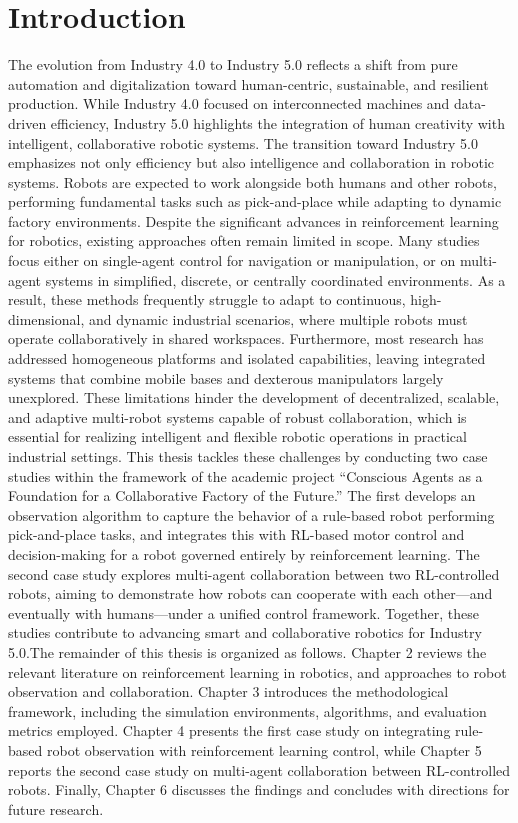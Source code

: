 \documentclass[english, 12pt, a4paper, elec, utf8, a-2b, online]{aaltothesis}
\begin{document}
\section{Introduction}
\label{sec:intro}

\thispagestyle{empty}

The evolution from Industry 4.0 to Industry 5.0 reflects a shift from pure automation and digitalization toward human-centric, sustainable, and resilient production. While Industry 4.0 focused on interconnected machines and data-driven efficiency, Industry 5.0 highlights the integration of human creativity with intelligent, collaborative robotic systems. The transition toward Industry 5.0 emphasizes not only efficiency but also intelligence and collaboration in robotic systems. Robots are expected to work alongside both humans and other robots, performing fundamental tasks such as pick-and-place while adapting to dynamic factory environments. Despite the significant advances in reinforcement learning for robotics, existing approaches often remain limited in scope. Many studies focus either on single-agent control for navigation or manipulation, or on multi-agent systems in simplified, discrete, or centrally coordinated environments. As a result, these methods frequently struggle to adapt to continuous, high-dimensional, and dynamic industrial scenarios, where multiple robots must operate collaboratively in shared workspaces. Furthermore, most research has addressed homogeneous platforms and isolated capabilities, leaving integrated systems that combine mobile bases and dexterous manipulators largely unexplored. These limitations hinder the development of decentralized, scalable, and adaptive multi-robot systems capable of robust collaboration, which is essential for realizing intelligent and flexible robotic operations in practical industrial settings. This thesis tackles these challenges by conducting two case studies within the framework of the academic project “Conscious Agents as a Foundation for a Collaborative Factory of the Future.” The first develops an observation algorithm to capture the behavior of a rule-based robot performing pick-and-place tasks, and integrates this with RL-based motor control and decision-making for a robot governed entirely by reinforcement learning. The second case study explores multi-agent collaboration between two RL-controlled robots, aiming to demonstrate how robots can cooperate with each other—and eventually with humans—under a unified control framework. Together, these studies contribute to advancing smart and collaborative robotics for Industry 5.0.The remainder of this thesis is organized as follows. Chapter 2 reviews the relevant literature on reinforcement learning in robotics, and approaches to robot observation and collaboration. Chapter 3 introduces the methodological framework, including the simulation environments, algorithms, and evaluation metrics employed. Chapter 4 presents the first case study on integrating rule-based robot observation with reinforcement learning control, while Chapter 5 reports the second case study on multi-agent collaboration between RL-controlled robots. Finally, Chapter 6 discusses the findings and concludes with directions for future research.
\end{document}
